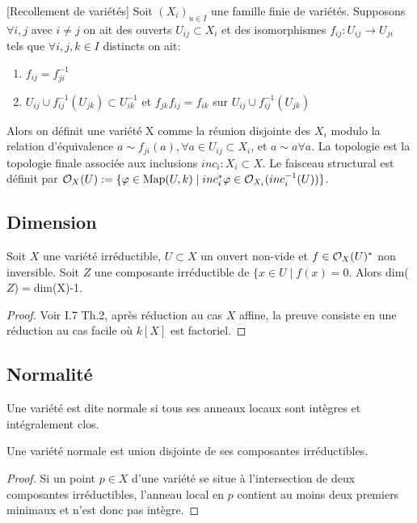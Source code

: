 \begin{cons}\label{gluevar}[Recollement de variétés]
Soit $(X_i)_{u\in I}$ une famille finie de variétés. Supposons $\forall i,j$ avec $i\neq j$ on ait des ouverts $U_{ij}\subset X_i$ et des isomorphismes $f_{ij}:U_{ij}\rightarrow U_{ji}$ tels que $\forall i,j,k\in I$ distincts on ait:
	\begin{enumerate}
	\item $f_{ij}=f_{ji}^{-1}$
	\item $U_{ij}\cup f_{ij}^{-1}(U_{jk})\subset U_{ik}^{-1}$ et $f_{jk}f_{ij}=f_{ik}$ sur $U_{ij}\cup f_{ij}^{-1}(U_{jk})$
	\end{enumerate}
Alors on définit une variété X comme la réunion disjointe des $X_i$ modulo la relation d'équivalence $a\sim f_{ji}(a),\forall a\in U_{ij}\subset X_i$, et $a\sim a \forall a$. La topologie est la topologie finale associée aux inclusions $inc_i:X_i\subset X$. Le faisceau structural est définit par $\mathcal{O}_X(U):=\lbrace \varphi\in \textrm{Map}(U,k)\mid inc_i^*\varphi\in\mathcal{O}_{X_i}(inc_i^{-1}(U))\rbrace$.
\end{cons}


\subsection{Dimension}

\begin{thm}\label{dimsousvariete}
Soit $X$ une variété irréductible, $U\subset X$ un ouvert non-vide et $f\in \mathcal{O}_X(U)^*$ non inversible. Soit $Z$ une composante irréductible de $\lbrace x \in U \mid f(x)=0$. Alors dim($Z$)$=$dim(X)-1.
\end{thm}
\begin{proof}
Voir \cite{MumfordRedBook} I.7 Th.2, après réduction au cas $X$ affine, la preuve consiste en une réduction au cas facile où $k[X]$ est factoriel. 
\end{proof}

\subsection{Normalité}

\begin{defn}
Une variété est dite normale si tous ses anneaux locaux sont intègres et intégralement clos.
\end{defn}

\begin{prop}\label{normaluniondisjointe}
Une variété normale est union disjointe de ses composantes irréductibles.
\end{prop}
\begin{proof}
Si un point $p\in X$ d'une variété se situe à l'intersection de deux composantes irréductibles, l'anneau local en $p$ contient au moins deux premiers minimaux et n'est donc pas intègre.
\end{proof}




